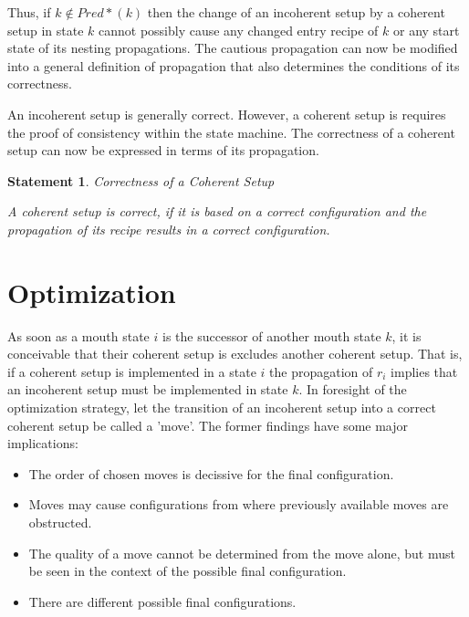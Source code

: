 \documentclass[12pt,a4paper]{scrartcl}
\newtheorem{statement}{Statement}
\begin{document}
Thus, if $k\notin Pred*(k)$  then the change of an incoherent setup by a
coherent setup in state $k$ cannot possibly cause any changed entry recipe
of $k$ or any start state of its nesting propagations. The cautious propagation
can now be modified into a general definition of propagation that also
determines the conditions of its correctness.

An incoherent setup is generally correct. However, a coherent setup is requires
the proof of consistency within the state machine. The correctness of a
coherent setup can now be expressed in terms of its propagation.

\begin{statement} Correctness of a Coherent Setup

    A coherent setup is correct, if it is based on a correct configuration and 
    the propagation of its recipe results in a correct configuration.
    
\end{statement}



\section{Optimization}

As soon as a mouth state $i$ is the successor of another mouth state $k$, it is
conceivable that their coherent setup is excludes another coherent setup. That
is, if a coherent setup is implemented in a state $i$ the propagation of $r_i$
implies that an incoherent setup must be implemented in state $k$.  In
foresight of the optimization strategy, let the transition of an incoherent
setup into a correct coherent setup be called a 'move'.  The former findings
have some major implications:

\begin{itemize}
    \item The order of chosen moves is decissive for the final configuration.

    \item Moves may cause configurations from where previously available 
          moves are obstructed.

    \item The quality of a move cannot be determined from the move alone, but
          must be seen in the context of the possible final configuration.

    \item There are different possible final configurations.
          
\end{itemize}
\end{document}
